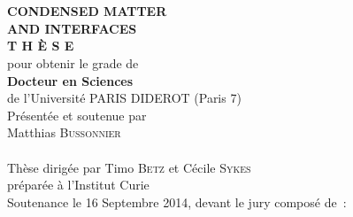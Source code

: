     \begin{center}
        \begin{minipage}{0.75\linewidth}
    \begin{center}
             \\ 
            \vspace*{0.3cm}
             \\
            \noindent \textbf{CONDENSED MATTER \\ AND INTERFACES} \\
            \vspace*{0.5cm}
            \noindent \Huge \textbf{T H È S E} \\
            \vspace*{0.3cm}
            \noindent \large {pour obtenir le grade de} \\
            \vspace*{0.3cm}
            \noindent \LARGE \textbf{Docteur en Sciences} \\
            \vspace*{0.3cm}
            \noindent \Large de l'Université PARIS DIDEROT (Paris 7) \\
            \vspace*{0.4cm}
            \noindent \large {Présentée et soutenue par\\}
            \noindent \LARGE Matthias \textsc{Bussonnier} \\
            \vspace*{0.8cm}
             \\
            \vspace*{0.8cm}
            \noindent \Large Thèse dirigée par Timo \textsc{Betz} et Cécile \textsc{Sykes} \\
            \vspace*{0.2cm}
            \noindent \Large préparée à l'Institut Curie \\
            \vspace*{0.2cm}
            \noindent \large Soutenance le 16 Septembre 2014, devant le jury composé de~:\\
            \vspace*{0.5cm}

\end{center}
\end{minipage}
\end{center}
